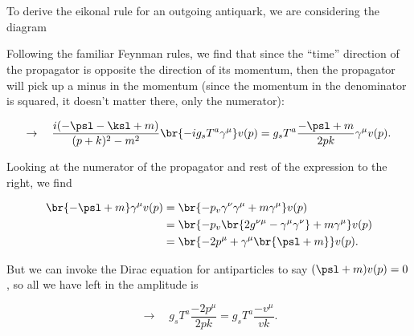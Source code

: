 \section{}

To derive the eikonal rule for an outgoing antiquark, we are considering the diagram

\begin{center}
\end{center}

Following the familiar Feynman rules, we find that since the ``time'' direction of the propagator is opposite the direction of its momentum, then the propagator will pick up a minus in the momentum (since the momentum in the denominator is squared, it doesn't matter there, only the numerator):

\begin{equation}
  \rightarrow\quad \frac{i(-\psl - \ksl + m)}{(p+k)^2 - m^2} \br{-ig_s T^a\gamma^\mu} v(p) = g_sT^a \frac{-\psl + m}{2pk} \gamma^\mu v(p).
\end{equation}

Looking at the numerator of the propagator and rest of the expression to the right, we find

\begin{align}
  \br{-\psl + m}\gamma^\mu v(p) &= \br{-p_v\gamma^\nu\gamma^\mu + m\gamma^\mu}v(p) \\
                                &= \br{-p_v\br{2g^{\nu\mu} - \gamma^\mu\gamma^\nu} + m\gamma^\mu}v(p) \\
                                &= \br{-2p^\mu + \gamma^\mu\br{\psl + m}}v(p).
\end{align}

But we can invoke the Dirac equation for antiparticles to say $(\psl + m)v(p) = 0$, so all we have left in the amplitude is

\begin{equation}
  \rightarrow\quad g_sT^a \frac{-2p^\mu}{2pk} = g_sT^a \frac{-v^\mu}{vk}.
\end{equation}

